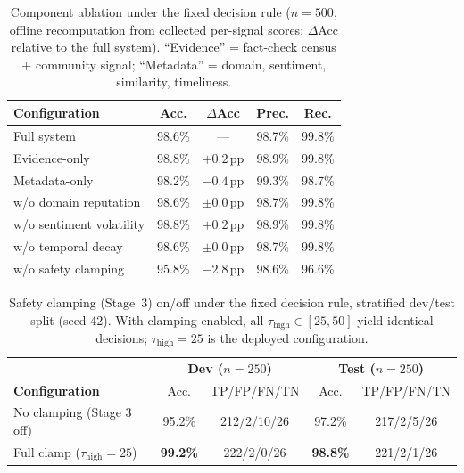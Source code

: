 \begin{table}[!htbp]
\caption{Component ablation under the fixed decision rule ($n=500$, offline recomputation from collected per-signal scores; $\Delta$Acc relative to the full system). ``Evidence'' = fact-check census + community signal; ``Metadata'' = domain, sentiment, similarity, timeliness.}
\label{tab:ablation}
\centering
\begin{tabular}{lcccc}
\toprule
\textbf{Configuration} & \textbf{Acc.} & \textbf{$\Delta$Acc} & \textbf{Prec.} & \textbf{Rec.} \\
\midrule
Full system            & 98.6\% & ---      & 98.7\% & 99.8\% \\
Evidence-only          & 98.8\% & $+0.2$\,pp & 98.9\% & 99.8\% \\
Metadata-only          & 98.2\% & $-0.4$\,pp & 99.3\% & 98.7\% \\
w/o domain reputation  & 98.6\% & $\pm0.0$\,pp & 98.7\% & 99.8\% \\
w/o sentiment volatility & 98.8\% & $+0.2$\,pp & 98.9\% & 99.8\% \\
w/o temporal decay     & 98.6\% & $\pm0.0$\,pp & 98.7\% & 99.8\% \\
w/o safety clamping    & 95.8\% & $-2.8$\,pp & 98.6\% & 96.6\% \\
\bottomrule
\end{tabular}
\end{table}

\begin{table}[!htbp]
\caption{Safety clamping (Stage~3) on/off under the fixed decision rule, stratified dev/test split (seed 42). With clamping enabled, all $\tau_{\text{high}} \in [25, 50]$ yield identical decisions; $\tau_{\text{high}} = 25$ is the deployed configuration.}
\label{tab:clamp}
\centering
\begin{tabular}{lcccc}
\toprule
& \multicolumn{2}{c}{\textbf{Dev ($n=250$)}} & \multicolumn{2}{c}{\textbf{Test ($n=250$)}} \\
\textbf{Configuration} & Acc. & TP/FP/FN/TN & Acc. & TP/FP/FN/TN \\
\midrule
No clamping (Stage 3 off) & 95.2\% & 212/2/10/26 & 97.2\% & 217/2/5/26 \\
Full clamp ($\tau_{\text{high}}{=}25$) & \textbf{99.2\%} & 222/2/0/26 & \textbf{98.8\%} & 221/2/1/26 \\
\bottomrule
\end{tabular}
\end{table}

